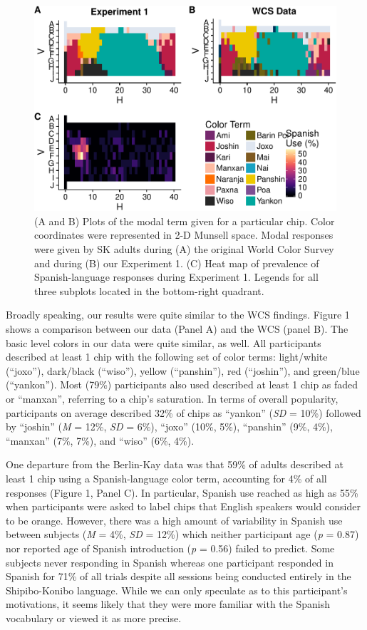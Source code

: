 \documentclass[floatsintext,man]{apa6}
\theoremstyle{definition}
\theoremstyle{definition}
\theoremstyle{definition}
\theoremstyle{remark}
\begin{document}
\begin{figure}
\centering
\includegraphics{amazon_color_files/figure-latex/adultfigure-1.pdf}
\caption{\label{fig:adultfigure}(A and B) Plots of the modal term given for
a particular chip. Color coordinates were represented in 2-D Munsell
space. Modal responses were given by SK adults during (A) the original
World Color Survey and during (B) our Experiment 1. (C) Heat map of
prevalence of Spanish-language responses during Experiment 1. Legends
for all three subplots located in the bottom-right quadrant.}
\end{figure}

Broadly speaking, our results were quite similar to the WCS findings.
Figure 1 shows a comparison between our data (Panel A) and the WCS
(panel B). The basic level colors in our data were quite similar, as
well. All participants described at least 1 chip with the following set
of color terms: light/white (\enquote{joxo}), dark/black
(\enquote{wiso}), yellow (\enquote{panshin}), red (\enquote{joshin}),
and green/blue (\enquote{yankon}). Most (79\%) participants also used
described at least 1 chip as faded or \enquote{manxan}, referring to a
chip's saturation. In terms of overall popularity, participants on
average described 32\% of chips as \enquote{yankon} (\emph{SD} = 10\%)
followed by \enquote{joshin} (\emph{M} = 12\%, \emph{SD} = 6\%),
\enquote{joxo} (10\%, 5\%), \enquote{panshin} (9\%, 4\%),
\enquote{manxan} (7\%, 7\%), and \enquote{wiso} (6\%, 4\%).

One departure from the Berlin-Kay data was that 59\% of adults described
at least 1 chip using a Spanish-language color term, accounting for 4\%
of all responses (Figure 1, Panel C). In particular, Spanish use reached
as high as 55\% when participants were asked to label chips that English
speakers would consider to be orange. However, there was a high amount
of variability in Spanish use between subjects (\emph{M} = 4\%,
\emph{SD} = 12\%) which neither participant age (\emph{p} = 0.87) nor
reported age of Spanish introduction (\emph{p} = 0.56) failed to
predict. Some subjects never responding in Spanish whereas one
participant responded in Spanish for 71\% of all trials despite all
sessions being conducted entirely in the Shipibo-Konibo language. While
we can only speculate as to this participant's motivations, it seems
likely that they were more familiar with the Spanish vocabulary or
viewed it as more precise.
\end{document}
